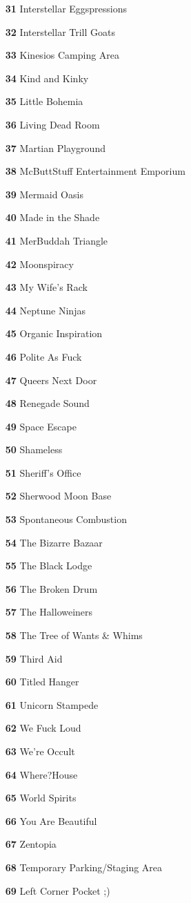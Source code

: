 \begin{itemize}[itemsep=.0125mm,parsep=2pt]
	\item[\textbf{ 31 }] Interstellar Eggspressions
	\item[\textbf{ 32 }] Interstellar Trill Goats
	\item[\textbf{ 33 }] Kinesios Camping Area
	\item[\textbf{ 34 }] Kind and Kinky
	\newpage
	\item[\textbf{ 35 }] Little Bohemia
	\item[\textbf{ 36 }] Living Dead Room
	\item[\textbf{ 37 }] Martian Playground
	\item[\textbf{ 38 }] McButtStuff Entertainment Emporium
	\item[\textbf{ 39 }] Mermaid Oasis
	\item[\textbf{ 40 }] Made in the Shade
	\item[\textbf{ 41 }] MerBuddah Triangle
	\item[\textbf{ 42 }] Moonspiracy
	\item[\textbf{ 43 }] My Wife's Rack
	\item[\textbf{ 44 }] Neptune Ninjas
	\item[\textbf{ 45 }] Organic Inspiration
	\item[\textbf{ 46 }] Polite As Fuck
	\item[\textbf{ 47 }] Queers Next Door
	\item[\textbf{ 48 }] Renegade Sound
	\item[\textbf{ 49 }] Space Escape
	\item[\textbf{ 50 }] Shameless
	\item[\textbf{ 51 }] Sheriff's Office
	\item[\textbf{ 52 }] Sherwood Moon Base
	\item[\textbf{ 53 }] Spontaneous Combustion
	\item[\textbf{ 54 }] The Bizarre Bazaar
	\item[\textbf{ 55 }] The Black Lodge
	\item[\textbf{ 56 }] The Broken Drum
	\item[\textbf{ 57 }] The Halloweiners
	\item[\textbf{ 58 }] The Tree of Wants \& Whims
	\item[\textbf{ 59 }] Third Aid
	\item[\textbf{ 60 }] Titled Hanger
	\item[\textbf{ 61 }] Unicorn Stampede
	\item[\textbf{ 62 }] We Fuck Loud
	\item[\textbf{ 63 }] We're Occult
	\item[\textbf{ 64 }] Where?House
	\item[\textbf{ 65 }] World Spirits
	\item[\textbf{ 66 }] You Are Beautiful
	\item[\textbf{ 67 }] Zentopia
	\item[\textbf{ 68 }] Temporary Parking/Staging Area
	\item[\textbf{ 69 }] Left Corner Pocket ;) 
\end{itemize}

